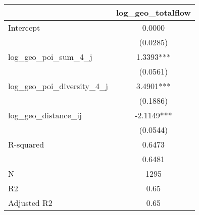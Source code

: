 \begin{table}
\caption{}
\begin{center}
\begin{tabular}{lc}
\hline
                               & log\_geo\_totalflow  \\
\midrule
Intercept                      & 0.0000               \\
                               & (0.0285)             \\
log\_geo\_poi\_sum\_4\_j       & 1.3393***            \\
                               & (0.0561)             \\
log\_geo\_poi\_diversity\_4\_j & 3.4901***            \\
                               & (0.1886)             \\
log\_geo\_distance\_ij         & -2.1149***           \\
                               & (0.0544)             \\
R-squared                      & 0.6473               \\
                               & 0.6481               \\
N                              & 1295                 \\
R2                             & 0.65                 \\
Adjusted R2                    & 0.65                 \\
\hline
\end{tabular}
\end{center}
\end{table}